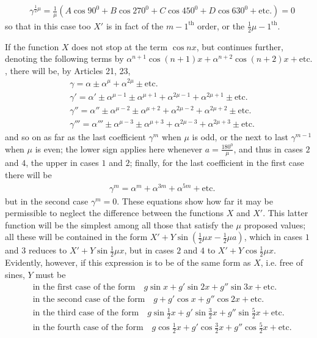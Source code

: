 \[
\begin{aligned}
&\gamma^{\frac12\mu}=\frac{1}{\mu}(A\cos 90^{{\mathord{0}}}+B\cos 270^{{\mathord{0}}}+C\cos 450^{{\mathord{0}}}+D\cos 630^{{\mathord{0}}}+\mathrm{etc.})=0
\end{aligned}
\]
so that in this case too $X'$ is in fact of the $m-1^{\mathrm{th}}$ order, or the $\frac12\mu-1^{\mathrm{th}}$.


If the function $X$ does not stop at the term $\cos nx$, but continues further, denoting the following terms by $\alpha^{n+1}\cos(n+1)x+\alpha^{n+2}\cos(n+2)x+\mathrm{etc.}$, there will be, by Articles 21, 23,
\[
\begin{aligned}
&\gamma = \alpha\pm\alpha^{\mu}+\alpha^{2\mu}\pm\mathrm{etc.}\\[5pt]
&\gamma' = \alpha'\pm\alpha^{\mu-1}\pm\alpha^{\mu+1}+\alpha^{2\mu-1}+\alpha^{2\mu+1}\pm\mathrm{etc.}\\[5pt]
&\gamma'' = \alpha''\pm\alpha^{\mu-2}\pm\alpha^{\mu+2}+\alpha^{2\mu-2}+\alpha^{2\mu+2}\pm\mathrm{etc.}\\[5pt]
&\gamma''' = \alpha'''\pm\alpha^{\mu-3}\pm\alpha^{\mu+3}+\alpha^{2\mu-3}+\alpha^{2\mu+3}\pm\mathrm{etc.}
\end{aligned}
\]
and so on as far as the last coefficient $\gamma^m$ when $\mu$ is odd, or the next to last $\gamma^{m-1}$ when $\mu$ is even; the lower sign applies here whenever $a=\frac{180^{{\mathord{0}}}}{\mu}$, and thus
in cases $2$ and $4$, the upper in cases $1$ and $2$; finally, for the last coefficient in the first case there will be
\[
\begin{aligned}
&\gamma^m=\alpha^m+\alpha^{3m}+\alpha^{5m}+\mathrm{etc.}
\end{aligned}
\]
but in the second case $\gamma^m=0$. These equations show how far it may be permissible to neglect the difference between the functions $X$ and $X'$. This latter function will be the simplest among all those that satisfy the $\mu$ proposed values; all these will be contained in the form $X'+Y\sin(\frac12\mu x-\frac12\mu a)$, which in cases $1$ and $3$ reduces to $X'+Y\sin\frac12\mu x$, but in cases $2$ and $4$ to $X'+Y\cos\frac12\mu x$. Evidently, however, if this expression is to be of the same form as $X$, i.e. free of sines, $Y$ must be
\[
\begin{aligned}
&\text{in the first case of the form} \quad  g\sin x+g'\sin 2x+g''\sin 3x+\mathrm{etc.}\\[5pt]
&\text{in the second case of the form} \quad  g+g'\cos x+g''\cos 2x+\mathrm{etc.}\\[5pt]
&\text{in the third case of the form} \quad  g\sin\frac12 x+g'\sin\frac32 x+g''\sin\frac52 x+\mathrm{etc.}\\[5pt]
&\text{in the fourth case of the form} \quad  g\cos\frac12 x+g'\cos\frac32 x+g''\cos\frac52 x+\mathrm{etc.}
\end{aligned}
\]
